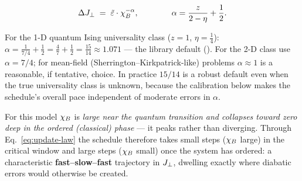 \begin{keyeq}
\begin{equation}
\Delta J_{\perp} \;=\; \tilde{\varepsilon}\cdot\chi_B^{-\alpha},
\qquad\qquad
\alpha=\frac{z}{2-\eta}+\frac12 .
\label{eq:update-law}
\end{equation}
\end{keyeq}

For the 1-D quantum Ising universality class ($z=1$, $\eta=\tfrac14$):
$\alpha=\frac{1}{7/4}+\frac12=\frac{4}{7}+\frac12=\frac{15}{14}\approx1.071$
--- the library default (). For the 2-D class use
$\alpha=7/4$; for mean-field (Sherrington--Kirkpatrick-like) problems
$\alpha\approx1$ is a reasonable, if tentative, choice. In practice
$15/14$ is a robust default even when the true universality class is
unknown, because the calibration below makes the schedule's overall pace
independent of moderate errors in $\alpha$.

\begin{physbox}
For this model $\chi_B$ is \emph{large near the quantum transition and
collapses toward zero deep in the ordered (classical) phase} --- it peaks
rather than diverging. Through Eq.~\eqref{eq:update-law} the schedule
therefore takes small steps ($\chi_B$ large) in the critical window and large
steps ($\chi_B$ small) once the system has ordered: a characteristic
\textbf{fast--slow--fast} trajectory in $J_{\perp}$, dwelling exactly where
diabatic errors would otherwise be created.
\end{physbox}

